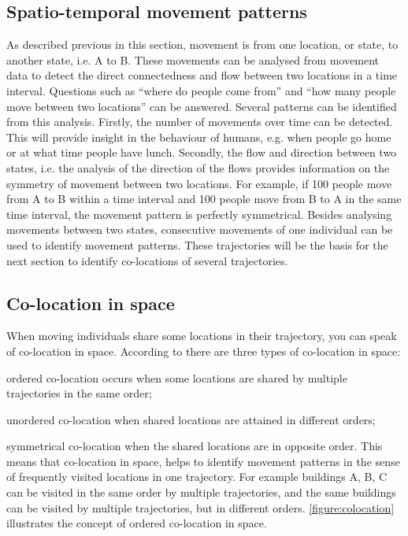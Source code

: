 \subsection{Spatio-temporal movement patterns}
As described previous in this section, movement is from one location, or state, to another state, i.e. A to B. These movements can be analysed from movement data to detect the direct connectedness and flow between two locations in a time interval. Questions such as “where do people come from” and “how many people move between two locations” can be answered. Several patterns can be identified from this analysis. Firstly, the number of movements over time can be detected. This will provide insight in the behaviour of humans, e.g. when people go home or at what time people have lunch. Secondly, the flow and direction between two states, i.e. the analysis of the direction of the flows provides information on the symmetry of movement between two locations. For example, if 100 people move from A to B within a time interval and 100 people move from B to A in the same time interval, the movement pattern is perfectly symmetrical.
Besides analysing movements between two states, consecutive movements of one individual can be used to identify movement patterns. These trajectories will be the basis for the next section to identify co-locations of several trajectories. 	

\subsection{Co-location in space}
When moving individuals share some locations in their trajectory, you can speak of co-location in space. According to \citep{dodge2008towards} there are three types of co-location in space: \begin {enumerate*} [label=\itshape\arabic*\upshape),font={\color{red!0!black}\bfseries}] \item ordered co-location occurs when some locations are shared by multiple trajectories in the same order; \item unordered co-location when shared locations are attained in different orders; \item symmetrical co-location when the shared locations are in opposite order. This means that co-location in space, helps to identify movement patterns in the sense of frequently visited  locations in one trajectory. For example buildings A, B, C can be visited in the same order by multiple trajectories, and the same buildings can be visited by multiple trajectories, but in different orders. \autoref{figure:colocation} illustrates the concept of ordered co-location in space.
\end{enumerate*}

